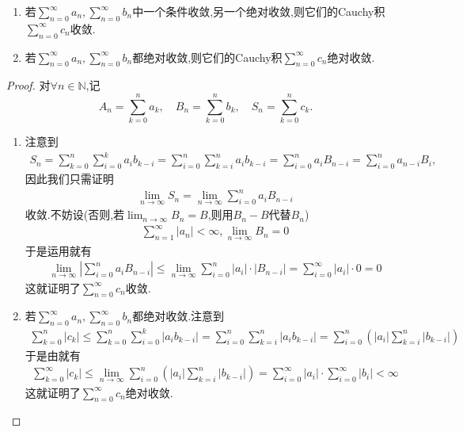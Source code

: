 \documentclass[../../main.tex]{subfiles}%
\begin{document}
\begin{theorem}[Cauchy积收敛定理]\label{theorem:Cauchy积收敛定理}
\begin{enumerate}[(1)]
\item 若$\sum\limits_{n=0}^{\infty} a_n,\sum\limits_{n=0}^{\infty} b_n$中一个条件收敛,另一个绝对收敛,则它们的Cauchy积$\sum\limits_{n=0}^{\infty} c_n$收敛.

\item 若$\sum\limits_{n=0}^{\infty} a_n,\sum\limits_{n=0}^{\infty} b_n$都绝对收敛,则它们的Cauchy积$\sum\limits_{n=0}^{\infty} c_n$绝对收敛.
\end{enumerate}
\end{theorem}
\begin{proof}
对$\forall n\in \mathbb{N}$,记
\[
A_n = \sum_{k = 0}^{n} a_k,\quad B_n = \sum_{k = 0}^{n} b_k,\quad S_n = \sum_{k = 0}^{n} c_k.
\]
\begin{enumerate}[(1)]
\item 注意到
\begin{align*}
S_n = \sum\limits_{k=0}^{n} \sum\limits_{i=0}^{k} a_i b_{k-i} = \sum\limits_{i=0}^{n} \sum\limits_{k=i}^{n} a_i b_{k-i} = \sum\limits_{i=0}^{n} a_i B_{n-i} = \sum\limits_{i=0}^{n} a_{n-i} B_i,
\end{align*}
因此我们只需证明
\begin{align*}
\lim\limits_{n\to\infty} S_n = \lim\limits_{n\to\infty}\sum\limits_{i=0}^{n} a_i B_{n-i}
\end{align*}
收敛.不妨设(否则,若$\lim_{n\to\infty}B_n=B$,则用$B_n-B$代替$B_n$)
\begin{align*}
\sum\limits_{n=1}^{\infty} |a_n| < \infty,\lim\limits_{n\to\infty} B_n = 0
\end{align*}
于是运用就有
\begin{align*}
\lim\limits_{n\to\infty} \left| \sum\limits_{i=0}^{n} a_i B_{n-i} \right| \leqslant \lim\limits_{n\to\infty} \sum\limits_{i=0}^{n} |a_i| \cdot |B_{n-i}| = \sum\limits_{i=0}^{\infty} |a_i| \cdot 0 = 0
\end{align*}
这就证明了$\sum\limits_{n=0}^{\infty} c_n$收敛.

\item 若$\sum\limits_{n=0}^{\infty} a_n,\sum\limits_{n=0}^{\infty} b_n$都绝对收敛.注意到
\begin{align*}
\sum\limits_{k=0}^{n} |c_k| \leqslant \sum\limits_{k=0}^{n} \sum\limits_{i=0}^{k} |a_i b_{k-i}| = \sum\limits_{i=0}^{n} \sum\limits_{k=i}^{n} |a_i b_{k-i}| = \sum\limits_{i=0}^{n} \left( |a_i| \sum\limits_{k=i}^{n} |b_{k-i}| \right)
\end{align*}
于是由就有
\begin{align*}
\sum\limits_{k=0}^{\infty} |c_k| \leqslant \lim\limits_{n\to\infty} \sum\limits_{i=0}^{n} \left( |a_i| \sum\limits_{k=i}^{n} |b_{k-i}| \right) = \sum\limits_{i=0}^{\infty} |a_i| \cdot \sum\limits_{i=0}^{\infty} |b_i| < \infty
\end{align*}
这就证明了$\sum\limits_{n=0}^{\infty} c_n$绝对收敛.
\end{enumerate}
\end{proof}
\end{document}
